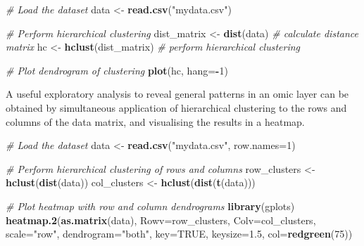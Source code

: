 \documentclass[
]{book}
\newenvironment{Shaded}{\begin{snugshade}}{\end{snugshade}}
\newcommand{\AttributeTok}[1]{\textcolor[rgb]{0.13,0.29,0.53}{#1}}
\newcommand{\CommentTok}[1]{\textcolor[rgb]{0.56,0.35,0.01}{\textit{#1}}}
\newcommand{\ConstantTok}[1]{\textcolor[rgb]{0.56,0.35,0.01}{#1}}
\newcommand{\DecValTok}[1]{\textcolor[rgb]{0.00,0.00,0.81}{#1}}
\newcommand{\FloatTok}[1]{\textcolor[rgb]{0.00,0.00,0.81}{#1}}
\newcommand{\FunctionTok}[1]{\textcolor[rgb]{0.13,0.29,0.53}{\textbf{#1}}}
\newcommand{\NormalTok}[1]{#1}
\newcommand{\OtherTok}[1]{\textcolor[rgb]{0.56,0.35,0.01}{#1}}
\newcommand{\SpecialCharTok}[1]{\textcolor[rgb]{0.81,0.36,0.00}{\textbf{#1}}}
\newcommand{\StringTok}[1]{\textcolor[rgb]{0.31,0.60,0.02}{#1}}
\begin{document}
\small

\begin{Shaded}
\begin{Highlighting}[]
\CommentTok{\# Load the dataset}
\NormalTok{data }\OtherTok{\textless{}{-}} \FunctionTok{read.csv}\NormalTok{(}\StringTok{"mydata.csv"}\NormalTok{)}

\CommentTok{\# Perform hierarchical clustering}
\NormalTok{dist\_matrix }\OtherTok{\textless{}{-}} \FunctionTok{dist}\NormalTok{(data)  }\CommentTok{\# calculate distance matrix}
\NormalTok{hc }\OtherTok{\textless{}{-}} \FunctionTok{hclust}\NormalTok{(dist\_matrix)  }\CommentTok{\# perform hierarchical clustering}

\CommentTok{\# Plot dendrogram of clustering}
\FunctionTok{plot}\NormalTok{(hc, }\AttributeTok{hang=}\SpecialCharTok{{-}}\DecValTok{1}\NormalTok{)}
\end{Highlighting}
\end{Shaded}

\normalsize

A useful exploratory analysis to reveal general patterns in an omic layer can be obtained by simultaneous application of hierarchical clustering to the rows and columns of the data matrix, and visualising the results in a heatmap.

\small

\begin{Shaded}
\begin{Highlighting}[]
\CommentTok{\# Load the dataset}
\NormalTok{data }\OtherTok{\textless{}{-}} \FunctionTok{read.csv}\NormalTok{(}\StringTok{"mydata.csv"}\NormalTok{, }\AttributeTok{row.names=}\DecValTok{1}\NormalTok{)}

\CommentTok{\# Perform hierarchical clustering of rows and columns}
\NormalTok{row\_clusters }\OtherTok{\textless{}{-}} \FunctionTok{hclust}\NormalTok{(}\FunctionTok{dist}\NormalTok{(data))}
\NormalTok{col\_clusters }\OtherTok{\textless{}{-}} \FunctionTok{hclust}\NormalTok{(}\FunctionTok{dist}\NormalTok{(}\FunctionTok{t}\NormalTok{(data)))}

\CommentTok{\# Plot heatmap with row and column dendrograms}
\FunctionTok{library}\NormalTok{(gplots)}
\FunctionTok{heatmap.2}\NormalTok{(}\FunctionTok{as.matrix}\NormalTok{(data),}
          \AttributeTok{Rowv=}\NormalTok{row\_clusters,}
          \AttributeTok{Colv=}\NormalTok{col\_clusters,}
          \AttributeTok{scale=}\StringTok{"row"}\NormalTok{,}
          \AttributeTok{dendrogram=}\StringTok{"both"}\NormalTok{,}
          \AttributeTok{key=}\ConstantTok{TRUE}\NormalTok{,}
          \AttributeTok{keysize=}\FloatTok{1.5}\NormalTok{,}
          \AttributeTok{col=}\FunctionTok{redgreen}\NormalTok{(}\DecValTok{75}\NormalTok{))}
\end{Highlighting}
\end{Shaded}
\end{document}
